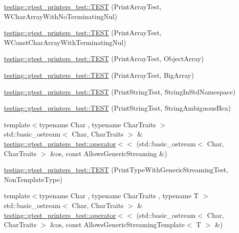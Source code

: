 \begin{DoxyCompactItemize}
\item 
\hyperlink{namespacetesting_1_1gtest__printers__test_ac19ec2732031bfe83b30ea9f00259ef3}{testing\+::gtest\+\_\+printers\+\_\+test\+::\+T\+E\+ST} (Print\+Array\+Test, W\+Char\+Array\+With\+No\+Terminating\+Nul)
\item 
\hyperlink{namespacetesting_1_1gtest__printers__test_a6a7cbcdbe748a1d4e90658f48f36c9da}{testing\+::gtest\+\_\+printers\+\_\+test\+::\+T\+E\+ST} (Print\+Array\+Test, W\+Const\+Char\+Array\+With\+Terminating\+Nul)
\item 
\hyperlink{namespacetesting_1_1gtest__printers__test_af91d8ad9d6c7547913fe05c7acc44114}{testing\+::gtest\+\_\+printers\+\_\+test\+::\+T\+E\+ST} (Print\+Array\+Test, Object\+Array)
\item 
\hyperlink{namespacetesting_1_1gtest__printers__test_a596493b56489aa1571fa26d1402e7116}{testing\+::gtest\+\_\+printers\+\_\+test\+::\+T\+E\+ST} (Print\+Array\+Test, Big\+Array)
\item 
\hyperlink{namespacetesting_1_1gtest__printers__test_abbd355e76033f0defd76c37523ad0f60}{testing\+::gtest\+\_\+printers\+\_\+test\+::\+T\+E\+ST} (Print\+String\+Test, String\+In\+Std\+Namespace)
\item 
\hyperlink{namespacetesting_1_1gtest__printers__test_ac20ee165500471e363011c3f664d2fb8}{testing\+::gtest\+\_\+printers\+\_\+test\+::\+T\+E\+ST} (Print\+String\+Test, String\+Ambiguous\+Hex)
\item 
{\footnotesize template$<$typename Char , typename Char\+Traits $>$ }\\std\+::basic\+\_\+ostream$<$ Char, Char\+Traits $>$ \& \hyperlink{namespacetesting_1_1gtest__printers__test_a1eb0213095e639d357692066e8505887}{testing\+::gtest\+\_\+printers\+\_\+test\+::operator$<$$<$} (std\+::basic\+\_\+ostream$<$ Char, Char\+Traits $>$ \&os, const Allows\+Generic\+Streaming \&)
\item 
\hyperlink{namespacetesting_1_1gtest__printers__test_a9272037c799c4779e1d79476dad66cb6}{testing\+::gtest\+\_\+printers\+\_\+test\+::\+T\+E\+ST} (Print\+Type\+With\+Generic\+Streaming\+Test, Non\+Template\+Type)
\item 
{\footnotesize template$<$typename Char , typename Char\+Traits , typename T $>$ }\\std\+::basic\+\_\+ostream$<$ Char, Char\+Traits $>$ \& \hyperlink{namespacetesting_1_1gtest__printers__test_a5464168e925b1adf29986c8e544e908e}{testing\+::gtest\+\_\+printers\+\_\+test\+::operator$<$$<$} (std\+::basic\+\_\+ostream$<$ Char, Char\+Traits $>$ \&os, const Allows\+Generic\+Streaming\+Template$<$ T $>$ \&)

\end{DoxyCompactItemize}

